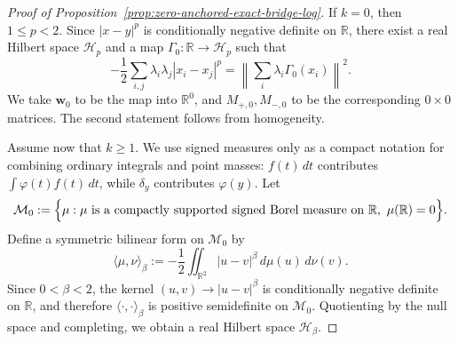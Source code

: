 \documentclass[10pt,a4paper]{amsart}
\newcommand{\R}{\mathbb R}
\begin{document}
\begin{proof}[Proof of Proposition~\ref{prop:zero-anchored-exact-bridge-log}]
If \(k=0\), then \(1\le p<2\). Since \(|x-y|^p\) is conditionally negative definite on \(\R\), there exist a real Hilbert space \(\mathcal H_p\) and a map \(\Gamma_0:\R\to\mathcal H_p\) such that
\[
-\frac12\sum_{i,j}\lambda_i\lambda_j|x_i-x_j|^p
=
\left\|\sum_i\lambda_i\Gamma_0(x_i)\right\|^2.
\]
We take \(\boldsymbol w_0\) to be the map into \(\mathbb R^0\), and \(M_{+,0},M_{-,0}\) to be the corresponding \(0\times0\) matrices. The second statement follows from homogeneity.

   Assume now that \(k\ge1\). We use signed measures only as a compact notation for combining ordinary integrals and point masses: \(f(t)\,dt\) contributes \(\int \varphi(t)f(t)\,dt\), while \(\delta_y\) contributes \(\varphi(y)\). Let
\[
\mathcal M_0:=
\Bigl\{
\mu:\mu\ \text{is a compactly supported signed Borel measure on }\mathbb R,\
\mu(\mathbb R)=0
\Bigr\}.
\]
Define a symmetric bilinear form on $\mathcal M_0$ by
\[
\langle \mu,\nu\rangle_\beta
:=
-\frac12\iint_{\mathbb R^2}|u-v|^\beta\,d\mu(u)\,d\nu(v).
\]
Since $0<\beta<2$, the kernel $(u,v)\rightarrow |u-v|^\beta$ is conditionally negative
definite on $\mathbb R$, and therefore $\langle\cdot,\cdot\rangle_\beta$ is positive
semidefinite on $\mathcal M_0$. Quotienting by the null space and completing, we
obtain a real Hilbert space $\mathcal H_\beta$.


\end{proof}
\end{document}
